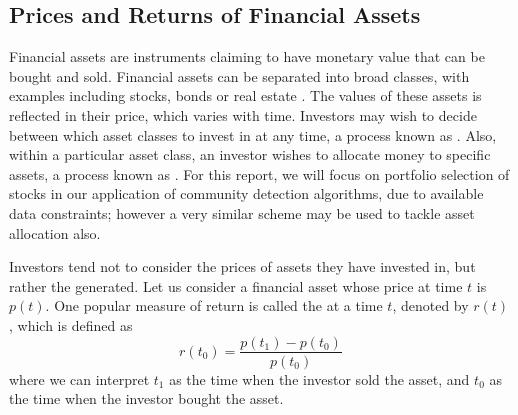 
\subsection{Prices and Returns of Financial Assets}
\label{subsec:financialAssetsBackground}

Financial assets are instruments claiming to have monetary value that can be bought and sold. Financial assets can be separated into broad classes, with examples including stocks, bonds or real estate \cite{Kuh12d,BKM13}.
The values of these assets is reflected in their price, which varies with time. Investors may wish to decide between which asset classes to invest in at any time, a process known as  \cite{BKM13}.
Also, within a particular asset class, an investor wishes to allocate money to specific assets, a process known as  \cite{BKM13}.
For this report, we will focus on portfolio selection of stocks in our application of community detection algorithms, due to available data constraints; however a very similar scheme may be used to tackle asset allocation also.

Investors tend not to consider the prices of assets they have invested in, but rather the  generated. Let us consider a financial asset whose price at time $t$ is $p(t)$. One popular measure of return is called the  \cite{Kuh12e,BKM13} at a time $t$, denoted by $r(t)$, which is defined as
\begin{equation}
	\label{eq:rateOfReturn}
	r(t_{0}) = \frac{p(t_{1}) - p(t_{0})}{p(t_{0})}
\end{equation}
where we can interpret $t_{1}$ as the time when the investor sold the asset, and $t_{0}$ as the time when the investor bought the asset.

